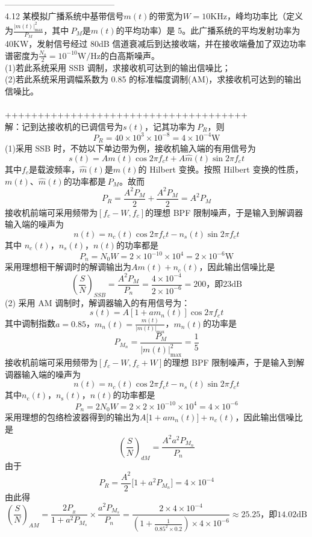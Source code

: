 \documentclass[utf8]{article}
\begin{document}
---------------------------------------\\
4.12 某模拟广播系统中基带信号$m(t)$的带宽为$W=10\mathrm{KHz}$，峰均功率比（定义为$\frac{|m(t)|_{\operatorname*{max}}^{2}}{P_{M}}$，其中$\ P_{M}$是$m(t)$的平均功率）是 5。此广播系统的平均发射功率为 40KW，发射信号经过 80dB 信道衰减后到达接收端，并在接收端叠加了双边功率谱密度为$\frac{N_{0}}{2}=10^{-10}\mathrm{W/Hz}$的白高斯噪声。 \\
(1)若此系统采用 SSB 调制，求接收机可达到的输出信噪比； \\
(2)若此系统采用调幅系数为 0.85 的标准幅度调制(AM)，求接收机可达到的输出信噪比。 \\
\\
+++++++++++++++++++++++++++++++++++++\\
解：记到达接收机的已调信号为$s(t)$，记其功率为$\ P_{R}$，则
$$P_{R}=40\times10^{3}\times10^{-8}=4\times10^{-4}\mathrm{{W}}$$
(1)采用 SSB 时，不妨以下单边带为例，接收机输入端的有用信号为
$$s\left(t\right)=A m\left(t\right)\cos2\pi f_{c}t+A\hat{m}\left(t\right)\sin2\pi f_{c}t$$
其中$f_{c}$是载波频率，${\hat{m}}(t)$是$m(t)$的 Hilbert 变换。按照 Hilbert 变换的性质，$m(t)$、${\hat{m}}(t)$的功率都是$\ P_{M}$。故而
$$P_{R}=\frac{A^{2}P_{M}}{2}+\frac{A^{2}P_{M}}{2}=A^{2}P_{M}$$
接收机前端可采用频带为$\left[f_{c}-W,f_{c}\right]$的理想 BPF 限制噪声，于是输入到解调器输入端的噪声为
$$n\left(t\right)=n_{c}\left(t\right)\cos2\pi f_{c}t-n_{s}\left(t\right)\sin2\pi f_{c}t$$
其中 ${n_{c}(t)}$，${n_{s}(t)}$，${n(t)}$的功率都是
$$P_{n}=N_{0}W=2\times10^{-10}\times10^{4}=2\times10^{-6}\mathrm{W}$$
采用理想相干解调时的解调输出为$A m\left(t\right)+n_{c}\left(t\right)$，因此输出信噪比是
$$\left({\frac{S}{N}}\right)_{S S B}={\frac{A^{2}P_{M}}{P_{n}}}={\frac{4\times10^{-4}}{2\times10^{-6}}}=200\text{，即23dB}$$
(2) 采用 AM 调制时，解调器输入的有用信号为： 
$$s\left(t\right)=A\left[1+a m_{n}\left(t\right)\right]\cos2\pi f_{c}t$$
其中调制指数$a=0.85$，$m_{n}\left(t\right)=\frac{m\left(t\right)}{\left|m\left(t\right)\right|_{\mathrm{max}}}$，$m_{n}\left(t\right)$的功率是
$${ P}_{M_{n}}=\frac{{P}_{M}}{\left|m\left(t\right)\right|_{\mathrm{max}}^{2}}=\frac{1}{5}$$
接收机前端可采用频带为$\left[f_{c}-W,f_{c}+W\right]$的理想 BPF 限制噪声，于是输入到解调器输入端的噪声为 
$$n\left(t\right)=n_{c}\left(t\right)\cos2\pi f_{c}t-n_{s}\left(t\right)\sin2\pi f_{c}t$$
其中${{n}}_{\mathrm{c}}(t)$，${{n}}_{\mathrm{s}}(t)$，${{n}}(t)$的功率都是
$$P_{n}=2N_{0}W=2\times2\times10^{-10}\times10^{4}=4\times10^{-6}$$
采用理想的包络检波器得到的输出为${\mathbf{}}A{\big[}1+a m_{n}\left(t\right){\big]}+n_{c}\left(t\right)$，因此输出信噪比是
$$\left(\frac{S}{N}\right)_{d M}=\frac{A^{2}a^{2}P_{M_{n}}}{P_{n}}$$
由于
$$P_{R}=\frac{A^{2}}{2}\Big[1+a^{2}P_{M_{n}}\Big]=4\times10^{-4}$$
由此得
$$\left(\frac{S}{N}\right)_{A M}=\frac{2P_{_R}}{1+a^{2}P_{M_{s}}}{\times}\frac{a^{2}P_{M_{s}}}{P_{n}}=\frac{2{\times}4{\times}10^{-4}}{\left(1+\frac{1}{0.85^{2}{\times}0.2}\right){\times}4{\times}10^{-6}}{\approx}25.25\text{，即14.02dB}$$
\end{document}
